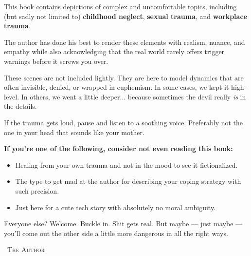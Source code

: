 \begin{tcolorbox}[
  enhanced,
  breakable,
  colback=white,
  colframe=red!70!black,
  coltitle=black,
  boxrule=1pt,
  arc=2mm,
  left=8mm,
  right=8mm,
  top=5mm,
  bottom=5mm,
  sharp corners=south,
  fonttitle=\LARGE\bfseries\sffamily,
  fontupper=\large\sffamily,
  title=\faExclamationTriangle\quad CONTENT WARNING: THIS BOOK MAY HURT (A LITTLE)
]

\bigskip

This book contains depictions of complex and uncomfortable topics, including (but sadly 
not limited to) \textbf{childhood neglect}, \textbf{sexual trauma}, and \textbf{workplace 
trauma}. 

\medskip

The author has done his best to render these elements with realism, nuance, and empathy
while also acknowledging that the real world rarely offers trigger warnings before 
it screws you over.

\medskip

These scenes are not included lightly. They are here to model dynamics that are often 
invisible, denied, or wrapped in euphemism. In some cases, we kept it high-level. In others, 
we went a little deeper... because sometimes the devil really \textit{is} in the details.

\medskip

If the trauma gets loud, pause and listen to a soothing voice. Preferably not the one in 
your head that sounds like your mother.

\medskip

\textbf{\large If you’re one of the following, consider not even reading this book:}

\begin{itemize}
  \item Healing from your own trauma and not in the mood to see it fictionalized.
  \item The type to get mad  at the author for describing your coping strategy with such precision.
  \item Just here for a cute tech story with absolutely no moral ambiguity.
\end{itemize}

\medskip

Everyone else? Welcome. Buckle in. Shit gets real. But maybe --- just maybe --- you’ll come 
out the other side a little more dangerous in all the right ways.

\bigskip

\hfill\textemdash\ \textsc{The Author}

\end{tcolorbox}
